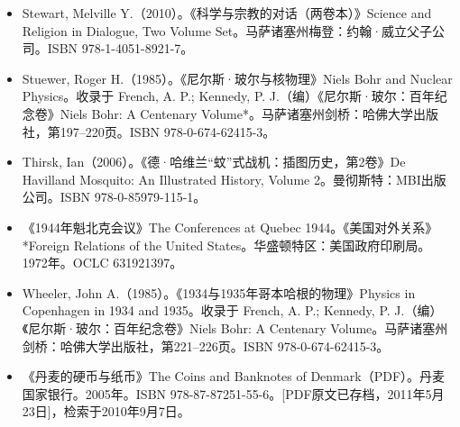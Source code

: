 \begin{itemize}
\item Stewart, Melville Y.（2010）。《科学与宗教的对话（两卷本）》Science and Religion in Dialogue, Two Volume Set。马萨诸塞州梅登：约翰·威立父子公司。ISBN 978-1-4051-8921-7。
\item Stuewer, Roger H.（1985）。《尼尔斯·玻尔与核物理》Niels Bohr and Nuclear Physics。收录于 French, A. P.; Kennedy, P. J.（编）《尼尔斯·玻尔：百年纪念卷》Niels Bohr: A Centenary Volume*。马萨诸塞州剑桥：哈佛大学出版社，第197–220页。ISBN 978-0-674-62415-3。
\item Thirsk, Ian（2006）。《德·哈维兰“蚊”式战机：插图历史，第2卷》De Havilland Mosquito: An Illustrated History, Volume 2。曼彻斯特：MBI出版公司。ISBN 978-0-85979-115-1。
\item 《1944年魁北克会议》The Conferences at Quebec 1944。《美国对外关系》*Foreign Relations of the United States。华盛顿特区：美国政府印刷局。1972年。OCLC 631921397。
\item Wheeler, John A.（1985）。《1934与1935年哥本哈根的物理》Physics in Copenhagen in 1934 and 1935。收录于 French, A. P.; Kennedy, P. J.（编）《尼尔斯·玻尔：百年纪念卷》Niels Bohr: A Centenary Volume。马萨诸塞州剑桥：哈佛大学出版社，第221–226页。ISBN 978-0-674-62415-3。
\item 《丹麦的硬币与纸币》The Coins and Banknotes of Denmark（PDF）。丹麦国家银行。2005年。ISBN 978-87-87251-55-6。[PDF原文已存档，2011年5月23日]，检索于2010年9月7日。
\end{itemize}
